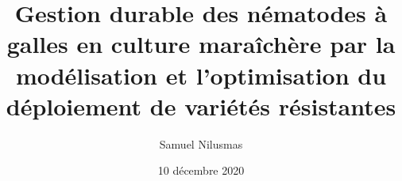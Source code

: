 \documentclass[xcolor={dvipsnames},10pt,compress,french]{beamer}
\author{Samuel Nilusmas}
\title{\bf Gestion durable des nématodes à galles
en culture maraîchère par la modélisation et
l’optimisation du déploiement de variétés
résistantes}
\date{10 décembre 2020}
\begin{document}
 
\begin{frame}[plain]
\maketitle
\end{frame}



\end{document}
